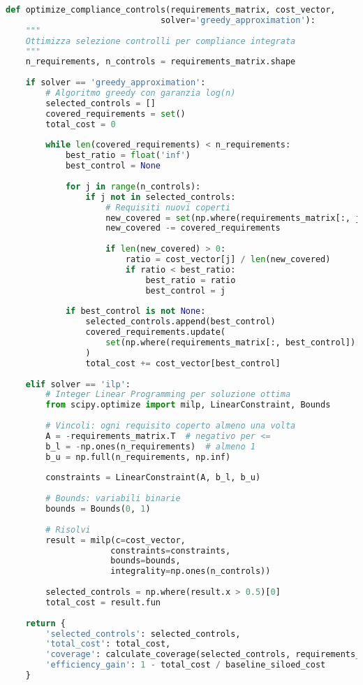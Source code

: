 \begin{lstlisting}[language=Python, caption=Ottimizzazione controlli compliance]
def optimize_compliance_controls(requirements_matrix, cost_vector, 
                               solver='greedy_approximation'):
    """
    Ottimizza selezione controlli per compliance integrata
    """
    n_requirements, n_controls = requirements_matrix.shape
    
    if solver == 'greedy_approximation':
        # Algoritmo greedy con garanzia log(n)
        selected_controls = []
        covered_requirements = set()
        total_cost = 0
        
        while len(covered_requirements) < n_requirements:
            best_ratio = float('inf')
            best_control = None
            
            for j in range(n_controls):
                if j not in selected_controls:
                    # Requisiti nuovi coperti
                    new_covered = set(np.where(requirements_matrix[:, j])[0])
                    new_covered -= covered_requirements
                    
                    if len(new_covered) > 0:
                        ratio = cost_vector[j] / len(new_covered)
                        if ratio < best_ratio:
                            best_ratio = ratio
                            best_control = j
                            
            if best_control is not None:
                selected_controls.append(best_control)
                covered_requirements.update(
                    set(np.where(requirements_matrix[:, best_control])[0])
                )
                total_cost += cost_vector[best_control]
                
    elif solver == 'ilp':
        # Integer Linear Programming per soluzione ottima
        from scipy.optimize import milp, LinearConstraint, Bounds
        
        # Vincoli: ogni requisito coperto almeno una volta
        A = -requirements_matrix.T  # negativo per <=
        b_l = -np.ones(n_requirements)  # almeno 1
        b_u = np.full(n_requirements, np.inf)
        
        constraints = LinearConstraint(A, b_l, b_u)
        
        # Bounds: variabili binarie
        bounds = Bounds(0, 1)
        
        # Risolvi
        result = milp(c=cost_vector,
                     constraints=constraints,
                     bounds=bounds,
                     integrality=np.ones(n_controls))
                     
        selected_controls = np.where(result.x > 0.5)[0]
        total_cost = result.fun
        
    return {
        'selected_controls': selected_controls,
        'total_cost': total_cost,
        'coverage': calculate_coverage(selected_controls, requirements_matrix),
        'efficiency_gain': 1 - total_cost / baseline_siloed_cost
    }
\end{lstlisting}

